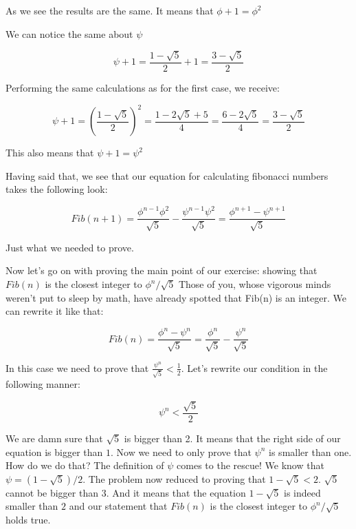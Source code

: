 As we see the results are the same. It means that $\phi+1 = \phi^2$

We can notice the same about $\psi$

\begin{equation}
	\psi+1 = \frac{1 - \sqrt5} {2} + 1 = \frac {3 - \sqrt5} {2}
\end{equation}

Performing the same calculations as for the first case, we receive:

\begin{equation}
	\psi+1 = \left(\frac {1 - \sqrt5} {2}\right)^2 = \frac {1 - 2\sqrt5 + 5} {4} = \frac {6 - 2\sqrt5} {4} = \frac {3 - \sqrt5} {2}
\end{equation}

This also means that $\psi+1 = \psi^2$

Having said that, we see that our equation for calculating fibonacci numbers takes the following look:

\begin{equation}
	Fib(n+1) = \frac {\phi^{n-1}\phi^2} {\sqrt5} - \frac{\psi^{n-1}\psi^2} {\sqrt5} = \frac {\phi^{n+1} - \psi^{n+1}} {\sqrt5}
\end{equation}

Just what we needed to prove.

Now let's go on with proving the main point of our exercise: showing that $Fib(n)$ is the closest integer to $\phi^n / \sqrt5$ Those of you, whose vigorous minds weren't put to sleep by math, have already spotted that Fib(n) is an integer. We can rewrite it like that:

\begin{equation}
	Fib(n) = \frac {\phi^n - \psi^n} {\sqrt5} = \frac {\phi^n} {\sqrt5} - \frac{\psi^n} {\sqrt5}
\end{equation}

In this case we need to prove that $\frac{\psi^n} {\sqrt5} < \frac {1} {2}$. Let's rewrite our condition in the following manner:

\begin{equation}
	\psi^n < \frac {\sqrt5} {2}
\end{equation}

We are damn sure that $\sqrt5$ is bigger than 2. It means that the right side of our equation is bigger than $1$. Now we need to only prove that $\psi^n$ is smaller than one. How do we do that? The definition of $\psi$ comes to the rescue! We know that $\psi=(1-\sqrt5) / 2$. The problem now reduced to proving that $1 - \sqrt5 < 2$. $\sqrt5$ cannot be bigger than $3$. And it means that the equation $1 - \sqrt5$ is indeed smaller than $2$ and our statement that $Fib(n)$ is the closest integer to $\phi^n / \sqrt5$ holds true.
